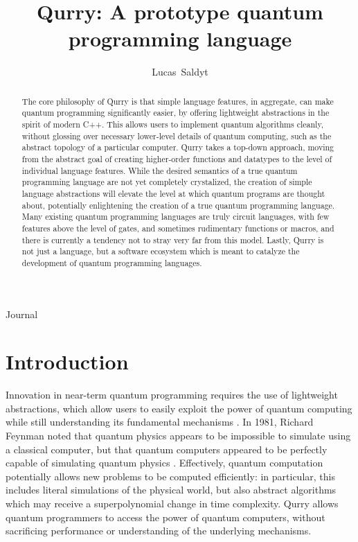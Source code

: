 \documentclass[journal]{article}
\begin{document}
\title{Qurry: A prototype quantum programming language}

\author{Lucas~Saldyt}

{Journal}

\maketitle

\begin{abstract}
     The core philosophy of Qurry is that simple language features, in aggregate, can make quantum programming significantly easier, by offering lightweight abstractions in the spirit of modern C++.
    This allows users to implement quantum algorithms cleanly, without glossing over necessary lower-level details of quantum computing, such as the abstract topology of a particular computer.
    Qurry takes a top-down approach, moving from the abstract goal of creating higher-order functions and datatypes to the level of individual language features.
    While the desired semantics of a true quantum programming language are not yet completely crystalized, the creation of simple language abstractions will elevate the level at which quantum programs are thought about, potentially enlightening the creation of a true quantum programming language.
    Many existing quantum programming languages are truly circuit languages, with few features above the level of gates, and sometimes rudimentary functions or macros, and there is currently a tendency not to stray very far from this model.
    Lastly, Qurry is not just a language, but a software ecosystem which is meant to catalyze the development of quantum programming languages.
\end{abstract}

\section{Introduction}

Innovation in near-term quantum programming requires the use of lightweight abstractions, which allow users to easily exploit the power of quantum computing while still understanding its fundamental mechanisms \cite{stroustrup}.
In 1981, Richard Feynman noted that quantum physics appears to be impossible to simulate using a classical computer, but that quantum computers appeared to be perfectly capable of simulating quantum physics \cite{feynman_1981}.
Effectively, quantum computation potentially allows new problems to be computed efficiently: in particular, this includes literal simulations of the physical world, but also abstract algorithms which may receive a superpolynomial change in time complexity.
Qurry allows quantum programmers to access the power of quantum computers, without sacrificing performance or understanding of the underlying mechanisms.
\end{document}
